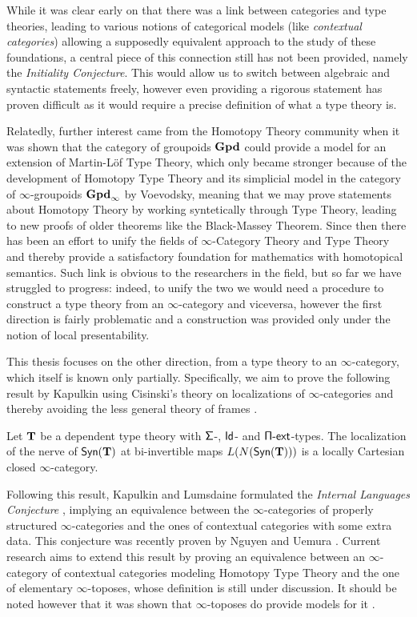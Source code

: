 \noindent
While it was clear early on that there was a link between categories and type
theories, leading to various notions of categorical models (like
\emph{contextual categories}) allowing a supposedly
equivalent approach to the study of these foundations, a central piece of this
connection still has not been provided, namely the \emph{Initiality Conjecture}.
This would allow us to switch between algebraic and syntactic statements freely,
however even providing a rigorous statement has proven difficult as it would
require a precise definition of what a type theory is.

\noindent
Relatedly, further interest came from the Homotopy Theory community when it was
shown that the category of groupoids $\operatorname{\mathbf{Gpd}}$ could provide a model for an
extension of Martin-L{\"o}f Type Theory, which only became stronger because of
the development of
Homotopy Type Theory and its simplicial model in the category of
$\infty$-groupoids $\operatorname{\mathbf{Gpd}_\infty}$ by
Voevodsky, meaning that we may prove statements about Homotopy Theory by working
syntetically through Type Theory, leading to new proofs of older theorems like
the Black-Massey Theorem. Since then there has been an effort to unify the
fields of $\infty$-Category Theory and Type Theory and thereby provide a
satisfactory foundation for mathematics with homotopical semantics. Such link is
obvious to the researchers in the field, but so far we have struggled to
progress: indeed, to unify the two we would need a procedure to construct a type
theory from an $\infty$-category and viceversa, however the first direction is
fairly problematic and a construction was provided only under the notion of
local presentability.

\noindent
This thesis focuses on the other direction, from a type theory to an
$\infty$-category, which itself is known only partially. Specifically, we aim to
prove the following result by Kapulkin \cite[Thm.\ 9.3.17]{Kap14} using
Cisinski's theory on localizations of $\infty$-categories \cite{Cis19} and
thereby avoiding the less general theory of frames \cite{Szu14,KS15}.

\begin{finalthm}
  Let $\operatorname{\mathbf{T}}$ be a dependent type theory with $\operatorname{\mathsf{\Sigma}}$-, $\operatorname{\mathsf{Id}}$- and
  $\operatorname{\mathsf{\Pi-ext}}$-types. The localization of the nerve of $\mathsf{Syn}(\mathbf{T})$ at bi-invertible
  maps $L(N(\mathsf{Syn}(\mathbf{T})))$ is a locally Cartesian closed $\infty$-category.
\end{finalthm}

\noindent
Following this result, Kapulkin and Lumsdaine formulated the \emph{Internal
Languages Conjecture} \cite[Conj.\ 3.7]{KL16}, implying an equivalence between
the $\infty$-categories of properly structured $\infty$-categories and the ones
of contextual categories with some extra data. This conjecture
was recently proven by Nguyen and Uemura \cite{NU22}. Current research aims to
extend this result by proving an equivalence between an $\infty$-category of
contextual categories modeling Homotopy Type Theory and the one of elementary
$\infty$-toposes, whose definition is still under discussion. It should be noted
however that it was shown that $\infty$-toposes do provide models for it
\cite{Shu19}.

